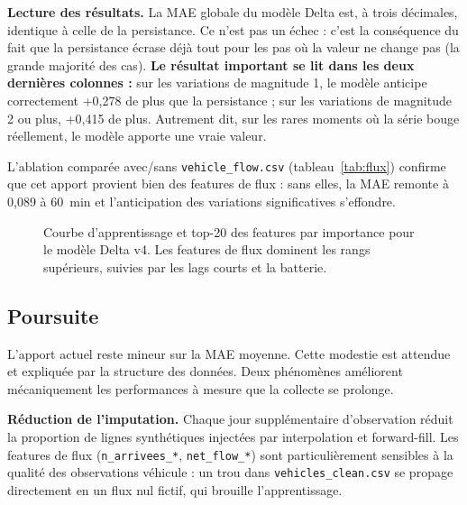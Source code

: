\documentclass[fleqn, 12pt]{scrartcl}
\begin{document}
\textbf{Lecture des résultats.} La MAE globale du modèle Delta est, à trois décimales, identique à celle de la persistance. Ce n'est pas un échec : c'est la conséquence du fait que la persistance écrase déjà tout pour les pas où la valeur ne change pas (la grande majorité des cas). \textbf{Le résultat important se lit dans les deux dernières colonnes :} sur les variations de magnitude 1, le modèle anticipe correctement +0{,}278 de plus que la persistance ; sur les variations de magnitude 2 ou plus, +0{,}415 de plus. Autrement dit, sur les rares moments où la série bouge réellement, le modèle apporte une vraie valeur.

\vspace{0.3cm}

L'ablation comparée avec/sans \texttt{vehicle\_flow.csv} (tableau~\ref{tab:flux}) confirme que cet apport provient bien des features de flux : sans elles, la MAE remonte à 0{,}089 à 60~min et l'anticipation des variations significatives s'effondre.

\begin{figure}[htp]
    \caption{Courbe d'apprentissage et top-20 des features par importance pour le modèle Delta v4. Les features de flux dominent les rangs supérieurs, suivies par les lags courts et la batterie.}
    \label{fig:training_curves}
\end{figure}


\subsection{Poursuite}
\label{ssec:poursuite}

L'apport actuel reste mineur sur la MAE moyenne. Cette modestie est attendue et expliquée par la structure des données. Deux phénomènes améliorent mécaniquement les performances à mesure que la collecte se prolonge.

\vspace{0.3cm}

\textbf{Réduction de l'imputation.} Chaque jour supplémentaire d'observation réduit la proportion de lignes synthétiques injectées par interpolation et forward-fill. Les features de flux (\texttt{n\_arrivees\_*}, \texttt{net\_flow\_*}) sont particulièrement sensibles à la qualité des observations véhicule : un trou dans \texttt{vehicles\_clean.csv} se propage directement en un flux nul fictif, qui brouille l'apprentissage.

\vspace{0.3cm}
\end{document}
